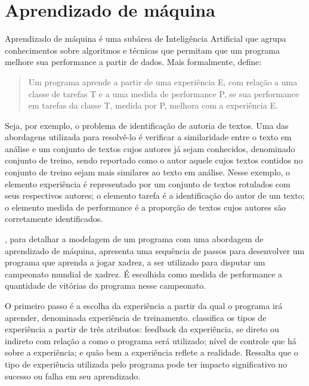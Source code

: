 \chapter{Aprendizado de máquina}

Aprendizado de máquina é uma subárea de Inteligência Artificial que agrupa conhecimentos sobre algoritmos e técnicas que permitam que um programa melhore sua performance a partir de dados. Mais formalmente, \cite[p.2, tradução nossa]{Tom_mitchell} define:

\begin{quote}
Um programa aprende a partir de uma experiência E, com relação a uma classe de tarefas T e a uma medida de performance P, se sua performance em tarefas da classe T, medida por P, melhora com a experiência E.
\end{quote}

Seja, por exemplo, o problema de identificação de autoria de textos. Uma das abordagens utilizada para resolvê-lo é verificar a similaridade entre o texto em análise e um conjunto de textos cujos autores já sejam conhecidos, denominado conjunto de treino, sendo reportado como o autor aquele cujos textos contidos no conjunto de treino sejam mais similares ao texto em análise. Nesse exemplo, o elemento experiência é representado por um conjunto de textos rotulados com seus respectivos autores; o elemento tarefa é a identificação do autor de um texto; o elemento medida de performance é a proporção de textos cujos autores são corretamente identificados.

\cite{Tom_mitchell}, para detalhar a modelagem de um programa com uma abordagem de aprendizado de máquina, apresenta uma sequência de passos para desenvolver um programa que aprenda a jogar xadrez, a ser utilizado para disputar um campeonato mundial de xadrez. É escolhida como medida de performance a quantidade de vitórias do programa nesse campeonato.


O primeiro passo é a escolha da experiência a partir da qual o programa irá aprender, denominada experiência de treinamento. \cite{Tom_mitchell} classifica os tipos de experiência a partir de três atributos: feedback da experiência, se direto ou indireto com relação a como o programa será utilizado; nível de controle que há sobre a experiência; e quão bem a experiência reflete a realidade. Ressalta que o tipo de experiência utilizada pelo programa pode ter impacto significativo no sucesso ou falha em seu aprendizado. 

